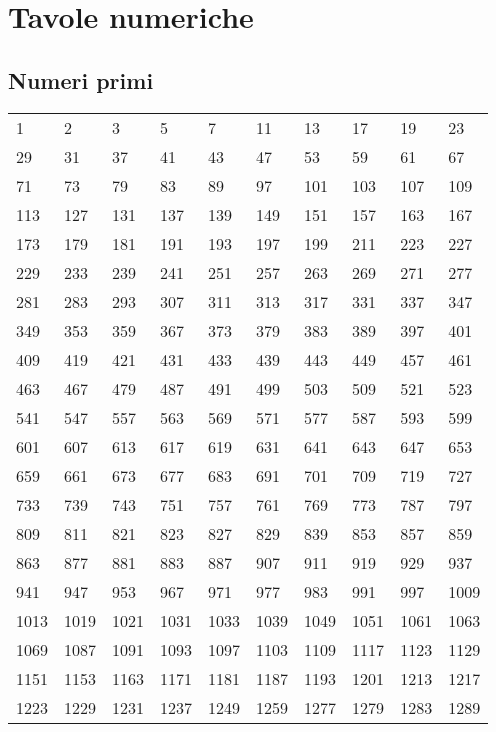 \chapter{Tavole numeriche}
\section{Numeri primi}
\begin{longtable}{llllllllll} 
	\toprule
1	&	2	&	3	&	5	&	7	&	11	&	13	&	17	&	19	&	23	\\
29	&	31	&	37	&	41	&	43	&	47	&	53	&	59	&	61	&	67	\\
71	&	73	&	79	&	83	&	89	&	97	&	101	&	103	&	107	&	109	\\
113	&	127	&	131	&	137	&	139	&	149	&	151	&	157	&	163	&	167	\\
173	&	179	&	181	&	191	&	193	&	197	&	199	&	211	&	223	&	227	\\
229	&	233	&	239	&	241	&	251	&	257	&	263	&	269	&	271	&	277	\\
281	&	283	&	293	&	307	&	311	&	313	&	317	&	331	&	337	&	347	\\
349	&	353	&	359	&	367	&	373	&	379	&	383	&	389	&	397	&	401	\\
409	&	419	&	421	&	431	&	433	&	439	&	443	&	449	&	457	&	461	\\
463	&	467	&	479	&	487	&	491	&	499	&	503	&	509	&	521	&	523	\\
541	&	547	&	557	&	563	&	569	&	571	&	577	&	587	&	593	&	599	\\
601	&	607	&	613	&	617	&	619	&	631	&	641	&	643	&	647	&	653	\\
659	&	661	&	673	&	677	&	683	&	691	&	701	&	709	&	719	&	727	\\
733	&	739	&	743	&	751	&	757	&	761	&	769	&	773	&	787	&	797	\\
809	&	811	&	821	&	823	&	827	&	829	&	839	&	853	&	857	&	859	\\
863	&	877	&	881	&	883	&	887	&	907	&	911	&	919	&	929	&	937	\\
941	&	947	&	953	&	967	&	971	&	977	&	983	&	991	&	997	&	1009	\\
1013	&	1019	&	1021	&	1031	&	1033	&	1039	&	1049	&	1051	&	1061	&	1063	\\
1069	&	1087	&	1091	&	1093	&	1097	&	1103	&	1109	&	1117	&	1123	&	1129	\\
1151	&	1153	&	1163	&	1171	&	1181	&	1187	&	1193	&	1201	&	1213	&	1217	\\
1223	&	1229	&	1231	&	1237	&	1249	&	1259	&	1277	&	1279	&	1283	&	1289	\\

\end{longtable}
